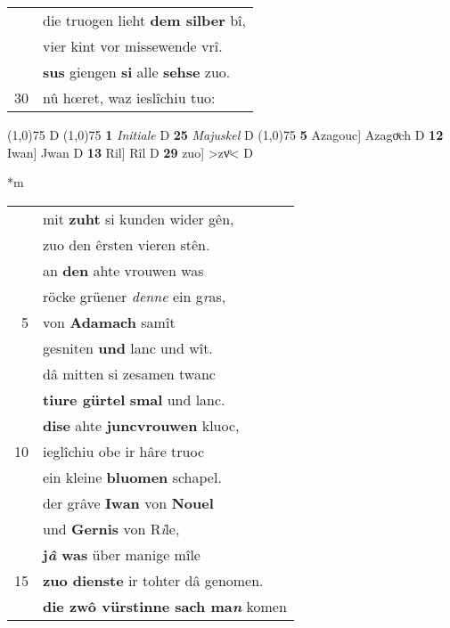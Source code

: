 \documentclass[8pt,a4paper,notitlepage]{article}
\begin{document}
\begin{table}[ht]
\begin{minipage}[t]{0.5\linewidth}
\begin{tabular}{rl}
 & die truogen lieht \textbf{dem silber} bî,\\ 
 & vier kint vor missewende vrî.\\ 
 & \textbf{sus} giengen \textbf{si} alle \textbf{sehse} zuo.\\ 
30 & nû hœret, waz ieslîchiu tuo:\\ 
\end{tabular}
\scriptsize
\line(1,0){75} \newline
D \newline
\line(1,0){75} \newline
\textbf{1} \textit{Initiale} D  \textbf{25} \textit{Majuskel} D  \newline
\line(1,0){75} \newline
\textbf{5} Azagouc] Azagoͮch D \textbf{12} Iwan] Jwan D \textbf{13} Ril] Rîl D \textbf{29} zuo] >zvͦ< D \newline
\end{minipage}
\hspace{0.5cm}
\begin{minipage}[t]{0.5\linewidth}
\small
\begin{center}*m
\end{center}
\begin{tabular}{rl}
 & mit \textbf{zuht} si kunden wider gên,\\ 
 & zuo den êrsten vieren stên.\\ 
 & an \textbf{den} ahte vrouwen was\\ 
 & röcke grüener \textit{denne} ein g\textit{r}as,\\ 
5 & von \textbf{Adamach} samît\\ 
 & gesniten \textbf{und} lanc und wît.\\ 
 & dâ mitten si zesamen twanc\\ 
 & \textbf{tiure gürtel} \textbf{smal} und lanc.\\ 
 & \textbf{dise} ahte \textbf{juncvrouwen} kluoc,\\ 
10 & ieglîchiu obe ir hâre truoc\\ 
 & ein kleine \textbf{bluomen} schapel.\\ 
 & der grâve \textbf{Iwan} von \textbf{Nouel}\\ 
 & und \textbf{Gernis} von R\textit{i}le,\\ 
 & \textbf{j\textit{â} was} über manige mîle\\ 
15 & \textbf{zuo dienste} ir tohter dâ genomen.\\ 
 & \textbf{die zwô vürstinne sach ma\textit{n}} komen\\ 

\end{tabular}
\end{minipage}
\end{table}
\end{document}
